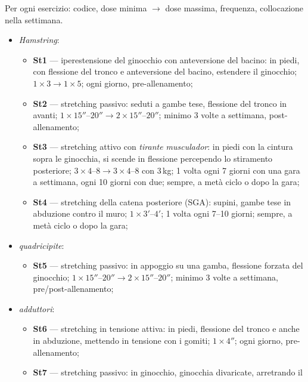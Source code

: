 Per ogni esercizio: codice, dose minima $\rightarrow$ dose massima, frequenza, collocazione nella
settimana.

\begin{itemize}
  \item \textit{Hamstring}:
    \begin{itemize}
      \item \textbf{St1} --- iperestensione del ginocchio con anteversione del bacino: in piedi, con
        flessione del tronco e anteversione del bacino, estendere il ginocchio;
        $1 \times 3 \rightarrow 1 \times 5$; ogni giorno, pre-allenamento;
      \item \textbf{St2} --- stretching passivo: seduti a gambe tese, flessione del tronco in avanti;
        $1 \times 15''$--$20'' \rightarrow 2 \times 15''$--$20''$; minimo 3 volte a settimana,
        post-allenamento;
      \item \textbf{St3} --- stretching attivo con \textit{tirante musculador}: in piedi con la
        cintura sopra le ginocchia, si scende in flessione percependo lo stiramento posteriore;
        $3 \times 4$--$8 \rightarrow 3 \times 4$--8 con 3\,kg; 1 volta ogni 7 giorni con una gara a
        settimana, ogni 10 giorni con due; sempre, a metà ciclo o dopo la gara;
      \item \textbf{St4} --- stretching della catena posteriore (SGA): supini, gambe tese in
        abduzione contro il muro; $1 \times 3'$--$4'$; 1 volta ogni 7--10 giorni; sempre, a metà
        ciclo o dopo la gara;
    \end{itemize}
  \item \textit{quadricipite}:
    \begin{itemize}
      \item \textbf{St5} --- stretching passivo: in appoggio su una gamba, flessione forzata del
        ginocchio; $1 \times 15''$--$20'' \rightarrow 2 \times 15''$--$20''$; minimo 3 volte a
        settimana, pre/post-allenamento;
    \end{itemize}
  \item \textit{adduttori}:
    \begin{itemize}
      \item \textbf{St6} --- stretching in tensione attiva: in piedi, flessione del tronco e anche
        in abduzione, mettendo in tensione con i gomiti; $1 \times 4''$; ogni giorno,
        pre-allenamento;
      \item \textbf{St7} --- stretching passivo: in ginocchio, ginocchia divaricate, arretrando il

\end{itemize}
\end{itemize}
